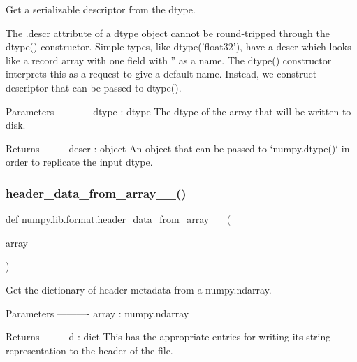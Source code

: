\begin{DoxyVerb}Get a serializable descriptor from the dtype.

The .descr attribute of a dtype object cannot be round-tripped through
the dtype() constructor. Simple types, like dtype('float32'), have
a descr which looks like a record array with one field with '' as
a name. The dtype() constructor interprets this as a request to give
a default name.  Instead, we construct descriptor that can be passed to
dtype().

Parameters
----------
dtype : dtype
    The dtype of the array that will be written to disk.

Returns
-------
descr : object
    An object that can be passed to `numpy.dtype()` in order to
    replicate the input dtype.\end{DoxyVerb}
 \mbox{\label{namespacenumpy_1_1lib_1_1format_af34f49d13b4598e1dea0cdad339ff01a}} 
\subsubsection{\texorpdfstring{header\+\_\+data\+\_\+from\+\_\+array\+\_\+\_()}{header\_data\_from\_array\_1\_0()}}
{\footnotesize\ttfamily def numpy.\+lib.\+format.\+header\+\_\+data\+\_\+from\+\_\+array\+\_\+\_ (\begin{DoxyParamCaption}\item[{}]{array }\end{DoxyParamCaption})}

\begin{DoxyVerb}Get the dictionary of header metadata from a numpy.ndarray.

Parameters
----------
array : numpy.ndarray

Returns
-------
d : dict
    This has the appropriate entries for writing its string representation
    to the header of the file.
\end{DoxyVerb}
 \mbox{\label{namespacenumpy_1_1lib_1_1format_af833693b9ca599e9e0e3186a817a131b}} 
